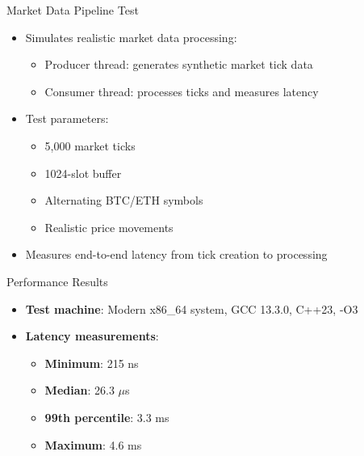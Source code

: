 \documentclass{beamer}
\begin{document}
\begin{frame}{Market Data Pipeline Test}
\begin{itemize}
    \item Simulates realistic market data processing:
    \begin{itemize}
        \item Producer thread: generates synthetic market tick data
        \item Consumer thread: processes ticks and measures latency
    \end{itemize}
    \item Test parameters:
    \begin{itemize}
        \item 5,000 market ticks
        \item 1024-slot buffer
        \item Alternating BTC/ETH symbols
        \item Realistic price movements
    \end{itemize}
    \item Measures end-to-end latency from tick creation to processing
\end{itemize}
\end{frame}

\begin{frame}{Performance Results}
\begin{itemize}
    \item \textbf{Test machine}: Modern x86\_64 system, GCC 13.3.0, C++23, -O3
    \item \textbf{Latency measurements}:
    \begin{itemize}
        \item \textbf{Minimum}: 215 ns
        \item \textbf{Median}: 26.3 $\mu$s
        \item \textbf{99th percentile}: 3.3 ms
        \item \textbf{Maximum}: 4.6 ms
    \end{itemize}
\end{itemize}

\begin{center}
\end{center}
\end{frame}
\end{document}
